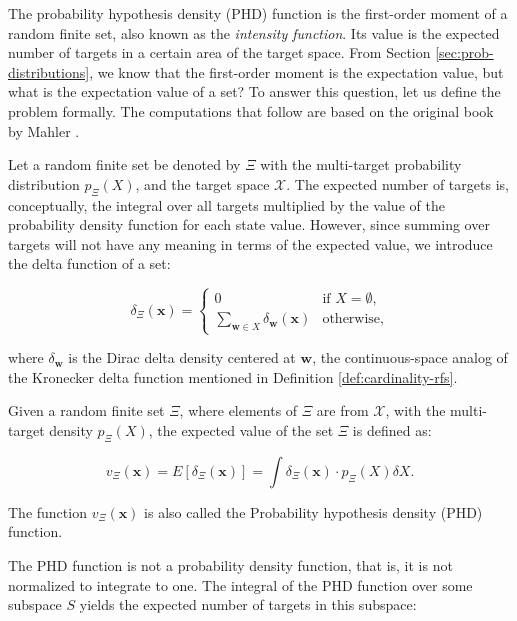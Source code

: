 The probability hypothesis density (PHD) function is the first-order moment of a random finite set, also known as the \textit{intensity function}. Its value is the expected number of targets in a certain area of the target space. From Section \ref{sec:prob-distributions}, we know that the first-order moment is the expectation value, but what is the expectation value of a set? To answer this question, let us define the problem formally. The computations that follow are based on the original book by Mahler \cite[576--578]{mahlerStatisticalMultisourcemultitargetInformation2007}.

Let a random finite set be denoted by $\Xi$ with the multi-target probability distribution $p_\Xi(X)$, and the target space $\mathcal{X}$. The expected number of targets is, conceptually, the integral over all targets multiplied by the value of the probability density function for each state value. However, since summing over targets will not have any meaning in terms of the expected value, we introduce the delta function of a set:

\begin{equation}
    \delta_\Xi(\mathbf{x}) = \begin{cases}
        0 & \text{if } X = \emptyset, \\
        \sum_{\mathbf{w} \in X} \delta_\mathbf{w}(\mathbf{x}) & \text{otherwise},
    \end{cases}
\end{equation}

\noindent where $\delta_\mathbf{w}$ is the Dirac delta density centered at $\mathbf{w}$, the continuous-space analog of the Kronecker delta function mentioned in Definition \ref{def:cardinality-rfs}.

\begin{definition}\label{def:phd-function}
    Given a random finite set $\Xi$, where elements of $\Xi$ are from $\mathcal{X}$, with the multi-target density $p_\Xi(X)$, the expected value of the set $\Xi$ is defined as:

    \begin{equation}
        v_\Xi(\mathbf{x}) = E[\delta_\Xi(\mathbf{x})] = \int \delta_\Xi(\mathbf{x}) \cdot p_\Xi(X) \delta X.
    \end{equation}

    \noindent The function $v_\Xi(\mathbf{x})$ is also called the Probability hypothesis density (PHD) function.
\end{definition}

The PHD function is not a probability density function, that is, it is not normalized to integrate to one. The integral of the PHD function over some subspace $S$ yields the expected number of targets in this subspace:

